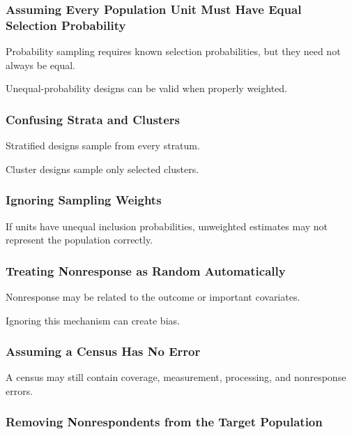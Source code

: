 \subsubsection{Assuming Every Population Unit Must Have Equal Selection Probability}

Probability sampling requires known selection probabilities, but they
need not always be equal.

Unequal-probability designs can be valid when properly weighted.

\subsubsection{Confusing Strata and Clusters}

Stratified designs sample from every stratum.

Cluster designs sample only selected clusters.

\subsubsection{Ignoring Sampling Weights}

If units have unequal inclusion probabilities, unweighted estimates may
not represent the population correctly.

\subsubsection{Treating Nonresponse as Random Automatically}

Nonresponse may be related to the outcome or important covariates.

Ignoring this mechanism can create bias.

\subsubsection{Assuming a Census Has No Error}

A census may still contain coverage, measurement, processing, and
nonresponse errors.

\subsubsection{Removing Nonrespondents from the Target Population}

